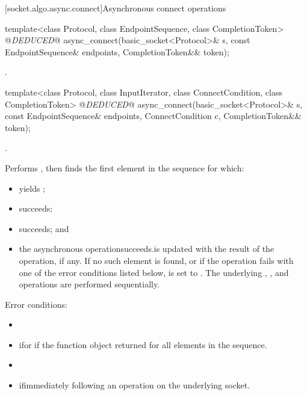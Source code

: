 [socket.algo.async.connect]{Asynchronous connect operations}

\begin{itemdecl}
template<class Protocol, class EndpointSequence, class CompletionToken>
  @\textit{DEDUCED}@ async_connect(basic_socket<Protocol>& s,
                        const EndpointSequence& endpoints,
                        CompletionToken&& token);
\end{itemdecl}

\begin{itemdescr}
\pnum
\returns {}.
\end{itemdescr}

\begin{itemdecl}
template<class Protocol, class InputIterator,
  class ConnectCondition, class CompletionToken>
    @\textit{DEDUCED}@ async_connect(basic_socket<Protocol>& s,
                          const EndpointSequence& endpoints,
                          ConnectCondition c,
                          CompletionToken&& token);
\end{itemdecl}

\begin{itemdescr}
\pnum
\completionsig {}.

\pnum
\effects Performs , then finds the first element  in the sequence  for which:
\begin{itemize}
\item
{}yields ;
\item
{}succeeds;
\item
{}succeeds; and
\item
 the asynchronous operationsucceeds.is updated with the result of the operation, if any. If no such element is found, or if the operation fails with one of the error conditions listed below, is set to . \enternote The underlying , , and  operations are performed sequentially. \exitnote
\end{itemize}

\pnum
Error conditions: 
\begin{itemize}
\item
{}
\item
 ifor if the function object returned for all elements in the sequence.
\item
{}
\item
 ifimmediately following an  operation on the underlying socket.
\end{itemize}
\end{itemdescr}

